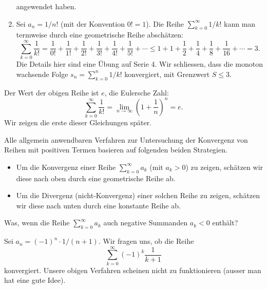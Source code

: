 \documentclass[../main.tex]{subfiles}
\begin{document}
\begin{enumerate}[(1)]
    angewendet haben.
  \item Sei $a_n = 1/n!$ (mit der Konvention $0! = 1$).
    Die Reihe $\sum_{k=0}^{\infty} 1/k!$ kann man
    termweise durch eine geometrische Reihe abschätzen:
    \[
      \sum_{k=0}^{\infty} \frac{1}{k!} = \frac{1}{0!}
      + \frac{1}{1!}
      + \frac{1}{2!}
      + \frac{1}{3!}
      + \frac{1}{4!}
      + \frac{1}{5!}
      + \cdots
      \leq
      1 + 1 + \frac{1}{2} + \frac{1}{4} + \frac{1}{8}
      + \frac{1}{16} + \cdots = 3.
    \]
    Die Details hier sind eine Übung auf Serie 4.
    Wir schliessen, dass die monoton wachsende Folge
    \(
      s_n = \sum_{k=0}^{n} {1}/{k!}
    \)
    konvergiert, mit Grenzwert $S \leq 3$.
\end{enumerate}

\begin{remark}
  Der Wert der obigen Reihe ist $e$, die Eulersche Zahl:
  \[
    \sum_{k=0}^{\infty} \frac{1}{k!} = \lim_{n \to \infty}
    {\left( 1+ \frac{1}{n} \right)}^n = e.
  \]
  Wir zeigen die erste dieser Gleichungen später.
\end{remark}

\begin{summary}
  Alle allgemein anwendbaren Verfahren zur Untersuchung
  der Konvergenz von Reihen mit positiven
  Termen basieren auf folgenden
  beiden Strategien.
  \begin{itemize}
    \item Um die Konvergenz einer Reihe
      $\sum_{k=0}^{\infty} a_k$ (mit $a_k > 0$) zu zeigen,
      schätzen wir diese nach oben durch
      eine geometrische Reihe ab.
    \item Um die Divergenz (nicht-Konvergenz) einer
      solchen Reihe zu zeigen, schätzen wir diese nach unten
      durch eine konstante Reihe ab.
  \end{itemize}
\end{summary}

\begin{question}
  Was, wenn die Reihe $\sum_{k=0}^{\infty} a_k$ auch
  negative Summanden $a_k < 0$ enthält?
\end{question}

\begin{example}
  Sei $a_n = {(-1)}^n \cdot 1/(n+1)$.
  Wir fragen uns, ob die Reihe
  \[
    \sum_{k=0}^{\infty} {(-1)}^k \frac{1}{k+1}
  \]
  konvergiert. Unsere obigen Verfahren scheinen 
  nicht zu funktionieren (ausser man hat eine
  gute Idee).
\end{example}
\end{document}
